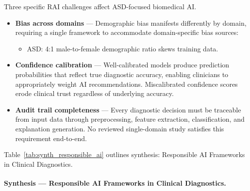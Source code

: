 Three specific RAI challenges affect ASD-focused biomedical AI.

\begin{itemize}[leftmargin=*, itemsep=3pt]
  \item \textbf{Bias across domains} --- Demographic bias manifests differently by domain, requiring a single framework to accommodate domain-specific bias sources:
    \begin{itemize}[leftmargin=1.5em, itemsep=2pt]
      \item ASD: 4:1 male-to-female demographic ratio skews training data.
    \end{itemize}
  \item \textbf{Confidence calibration} --- Well-calibrated models produce prediction probabilities that reflect true diagnostic accuracy, enabling clinicians to appropriately weight AI recommendations. Miscalibrated confidence scores erode clinical trust regardless of underlying accuracy.
  \item \textbf{Audit trail completeness} --- Every diagnostic decision must be traceable from input data through preprocessing, feature extraction, classification, and explanation generation. No reviewed single-domain study satisfies this requirement end-to-end.
\end{itemize}

\noindent Table~\ref{tab:synth_responsible_ai} outlines synthesis: Responsible AI Frameworks in Clinical Diagnostics.

\paragraph{Synthesis --- Responsible AI Frameworks in Clinical Diagnostics.}



